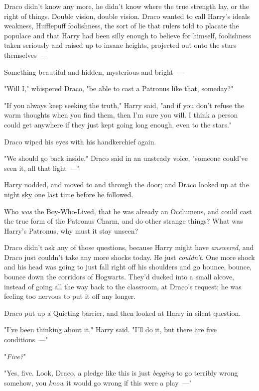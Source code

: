 Draco didn't know any more, he didn't know where the true strength lay, or the
right of things. Double vision, double vision. Draco wanted to call Harry's
ideals weakness, Hufflepuff foolishness, the sort of lie that rulers told to
placate the populace and that Harry had been silly enough to believe for
himself, foolishness taken seriously and raised up to insane heights, projected
out onto the stars themselves~---

Something beautiful and hidden, mysterious and bright~---

"Will I," whispered Draco, "be able to cast a Patronus like that, someday?"

"If you always keep seeking the truth," Harry said, "and if you don't refuse
the warm thoughts when you find them, then I'm sure you will. I think a person
could get anywhere if they just kept going long enough, even to the stars."

Draco wiped his eyes with his handkerchief again.

"We should go back inside," Draco said in an unsteady voice, "someone could've
seen it, all that light~---"

Harry nodded, and moved to and through the door; and Draco looked up at the
night sky one last time before he followed.

Who \emph{was} the Boy-Who-Lived, that he was already an Occlumens, and could
cast the true form of the Patronus Charm, and do other strange things? What was
Harry's Patronus, why must it stay unseen?

Draco didn't ask any of those questions, because Harry might have
\emph{answered}, and Draco just couldn't take any more shocks today. He just
\emph{couldn't}. One more shock and his head was going to just fall right off
his shoulders and go bounce, bounce, bounce down the corridors of Hogwarts.
\sbreak
They'd ducked into a small alcove, instead of going all the way back to the
classroom, at Draco's request; he was feeling too nervous to put it off any
longer.

Draco put up a Quieting barrier, and then looked at Harry in silent question.

"I've been thinking about it," Harry said. "I'll do it, but there are five
conditions~---"

"\emph{Five?}"

"Yes, five. Look, Draco, a pledge like this is just \emph{begging} to go
terribly wrong somehow, you \emph{know} it would go wrong if this were a
play~---"

